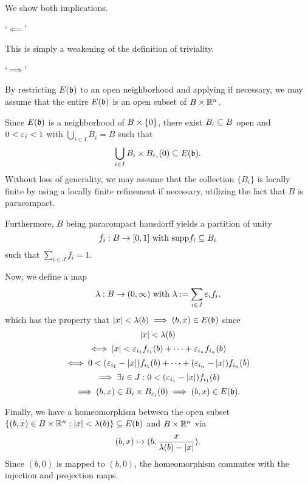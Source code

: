 \begin{myproof}
    We show both implications.

    `$\impliedby$'

    This is simply a weakening of the definition of triviality. 

    `$\implies$'

    By restricting $E(\bb)$ to an open neighborhood
    and applying  if necessary,
    we may assume that the entire $E(\bb)$ is an open subset of $B \times \mathbb{R}^n$.

    Since $E(\bb)$ is a neighborhood of $B \times{} \{0\}$,
    there exist $B_i \subseteq{} B$ open and $0 < \varepsilon{}_i < 1$ with $\bigcup_{i \in I} B_i = B$ such that
    \[ \bigcup_{i \in I } B_i \cross \ball[\eps_i] \sub E(\bb). \]
    Without loss of generality,
    we may assume that the collection $\{B_i\}$ is locally finite by using
    a locally finite refinement if necessary, utilizing the fact that $B$ is paracompact.

    Furthermore, $B$ being paracompact hausdorff yields a partition of unity
    \[ f_i: B \to [0, 1] \text{ with } \text{supp}{f_i} \subseteq{} B_i\]
    such that $\sum_{i \in J}f_i = 1$.
    
    Now, we define a map
    \[ \lambda: B \to (0, \infty) \text{ with } \lambda := \sum_{i \in J} \varepsilon{}_i f_i, \]
    which has the property that $\abs{x} < \lambda(b) \implies (b, x) \in E(\bb)$ since
    \[ \vert{} x \vert{} < \lambda(b) \]
    \[ \iff  \vert{} x \vert{} < \varepsilon{}_{i_1} f_{i_1}(b) + \cdots + \varepsilon{}_{i_n} f_{i_n}(b) \]
    \[ \iff 0 < (\varepsilon{}_{i_1} - \vert{} x \vert{}) f_{i_1}(b) + \cdots + (\varepsilon{}_{i_n} - \vert{} x \vert{}) f_{i_n}(b) \]
    \[ \implies \exists i \in J: 0 < (\varepsilon{}_{i_1} - \vert{} x \vert{}) f_{i_1}(b) \]
    \[ \implies (b, x) \in B_i \cross \ball[\eps_i]  \implies (b, x) \in E(\bb). \]

    Finally, we have a homeomorphism between the open subset
    $\set{(b, x) \in B \cross \R^n}{\abs{x} < \lambda(b)} \sub E(\bb)$ and $B \times \mathbb{R}^n$ via
    \[ (b, x) \mapsto (b, \frac{x}{\lambda(b) - \vert{} x \vert{}}). \]
    Since $(b, 0)$ is mapped to $(b, 0)$,
    the homeomorphism commutes with the injection and projection maps.
\end{myproof}